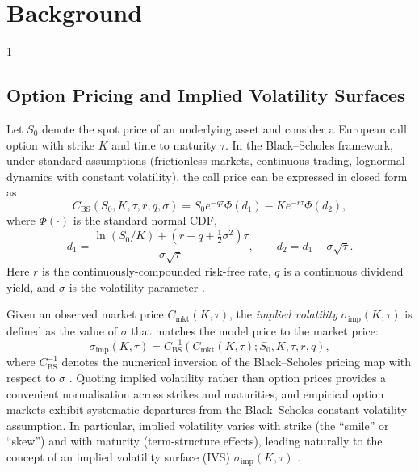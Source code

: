 \doublespacing %

\chapter{Background}
\label{ch2}

\begin{spacing}{1} %
\minitoc %
\end{spacing} %
\thesisspacing %

\section{Option Pricing and Implied Volatility Surfaces}

Let $S_0$ denote the spot price of an underlying asset and consider a European call option with strike $K$ and time to maturity $\tau$. In the Black--Scholes framework, under standard assumptions (frictionless markets, continuous trading, lognormal dynamics with constant volatility), the call price can be expressed in closed form as
\begin{equation}
C_{\text{BS}}(S_0,K,\tau,r,q,\sigma)=S_0 e^{-q\tau}\Phi(d_1)-K e^{-r\tau}\Phi(d_2),
\end{equation}
where $\Phi(\cdot)$ is the standard normal CDF,
\begin{equation}
d_1=\frac{\ln(S_0/K)+(r-q+\tfrac{1}{2}\sigma^2)\tau}{\sigma\sqrt{\tau}},
\qquad
d_2=d_1-\sigma\sqrt{\tau}.
\end{equation}
Here $r$ is the continuously-compounded risk-free rate, $q$ is a continuous dividend yield, and $\sigma$ is the volatility parameter \cite{BlaSch:73,Mer:73,Hul:18}.

Given an observed market price $C_{\text{mkt}}(K,\tau)$, the \emph{implied volatility} $\sigma_{\text{imp}}(K,\tau)$ is defined as the value of $\sigma$ that matches the model price to the market price:
\begin{equation}
\sigma_{\text{imp}}(K,\tau)
=
C_{\text{BS}}^{-1}\!\left(C_{\text{mkt}}(K,\tau); S_0,K,\tau,r,q\right),
\end{equation}
where $C_{\text{BS}}^{-1}$ denotes the numerical inversion of the Black--Scholes pricing map with respect to $\sigma$ \cite{Hul:18,Gat:06}. Quoting implied volatility rather than option prices provides a convenient normalisation across strikes and maturities, and empirical option markets exhibit systematic departures from the Black--Scholes constant-volatility assumption. In particular, implied volatility varies with strike (the ``smile'' or ``skew'') and with maturity (term-structure effects), leading naturally to the concept of an implied volatility surface (IVS) $\sigma_{\text{imp}}(K,\tau)$ \cite{Gat:06,Fen:05}.


